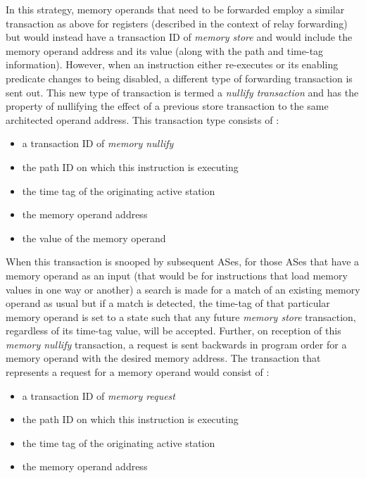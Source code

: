 \documentclass[10pt,dvips]{article}
\begin{document}
In this strategy, memory operands that need to be forwarded
employ a similar transaction as above for registers (described
in the context of relay forwarding) but would instead have
a transaction ID of \textit{memory store} and would
include the memory operand address and its value (along with the
path and time-tag information).
However, when an instruction either re-executes or
its enabling predicate changes to being disabled, a different
type of forwarding transaction is sent out.
This new type of transaction is termed a \textit{nullify transaction}
and has the property of nullifying the effect of a previous
store transaction to the same architected operand address.
This transaction type consists of :
%
\begin{itemize}
\vspace{-0.05in}
\item{a transaction ID of \textit{memory nullify}}
\vspace{-0.05in}
\item{the path ID on which this instruction is executing}
\vspace{-0.05in}
\item{the time tag of the originating active station}
\vspace{-0.05in}
\item{the memory operand address}
\vspace{-0.05in}
\item{the value of the memory operand}
\vspace{-0.05in}
\end{itemize}   
%
When this transaction is snooped by subsequent ASes,
for those ASes that have a memory operand as an input
(that would be for instructions that load memory values in
one way or another)
a search is made for a match of an existing memory
operand as usual but if a match is detected,
the time-tag of that particular memory operand is set to
a state such that any future \textit{memory store} transaction,
regardless of its time-tag value, will be accepted.
Further, on reception of this \textit{memory nullify} transaction,
a request is sent backwards in program order for a memory
operand with the desired memory address.
The transaction that represents a request for a memory
operand would consist of :
%
\begin{itemize}
\vspace{-0.05in}
\item{a transaction ID of \textit{memory request}}
\vspace{-0.05in}
\item{the path ID on which this instruction is executing}
\vspace{-0.05in}
\item{the time tag of the originating active station}
\vspace{-0.05in}
\item{the memory operand address}
\vspace{-0.05in}
\end{itemize}   
\end{document}
